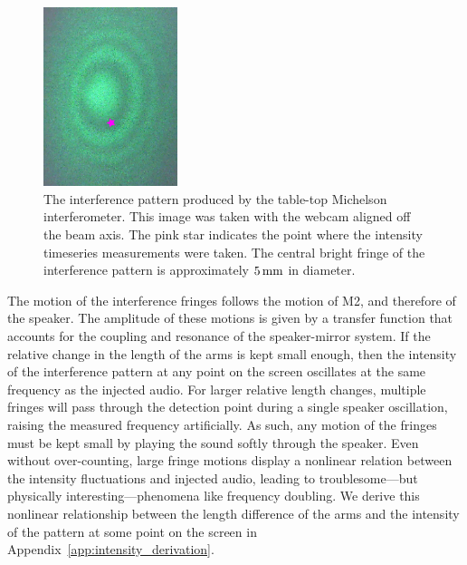 \documentclass[paper-main.tex]{subfiles}
\begin{document}
\begin{figure}
 \begin{center}
  \includegraphics[width=0.35\textwidth, angle=-90]{figures/webcam_still0_star.pdf}
 \end{center}
 \caption{\label{fig:interference_pattern}
The interference pattern produced by the table-top Michelson interferometer.
This image was taken with the webcam aligned off the beam axis. %
The pink star indicates the point where the intensity timeseries measurements were taken.
The central bright fringe of the interference pattern is approximately $5\,{\rm mm}$ in diameter. 
}
\end{figure}

The motion of the interference fringes follows the motion of M2, and therefore of the speaker.
The amplitude of these motions is given by a transfer function that accounts for the coupling and resonance of the speaker-mirror system.
If the relative change in the length of the arms is kept small enough, then the intensity of the interference pattern at any point on the screen oscillates at the same frequency as the injected audio.
For larger relative length changes, multiple fringes will pass through the detection point during a single speaker oscillation, raising the measured frequency artificially. 
As such, any motion of the fringes must be kept small by playing the sound softly through the speaker.
Even without over-counting, large fringe motions display a nonlinear relation between the intensity fluctuations and injected audio, leading to troublesome---but physically interesting---phenomena like frequency doubling.
We derive this nonlinear relationship between the length difference of the arms and the intensity of the pattern at some point on the screen in Appendix~\ref{app:intensity_derivation}.


\end{document}
